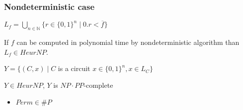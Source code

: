 \begin{frame}
    \frametitle{Nondeterministic case}

    $L_f = \bigcup\limits_{n \in \mathbb{N}}\{r \in \{0, 1\}^n \mid 0.r <
    \overline{f}\}$

    \begin{lemma}
        If $f$ can be computed in polynomial time by nondeterministic algorithm than
        $L_f \in HeurNP$.
    \end{lemma}
    
	$Y = \{(C, x) \mid C$ is a circuit $x \in \{0, 1\}^n, x \in L_{C}\}$
    
    \begin{lemma}
        $Y \in HeurNP$, $Y$ is $NP \cdot PP$-complete
    \end{lemma}

    \begin{itemize}
	    \item $Perm \in \#P$
    \end{itemize}
    
\end{frame}